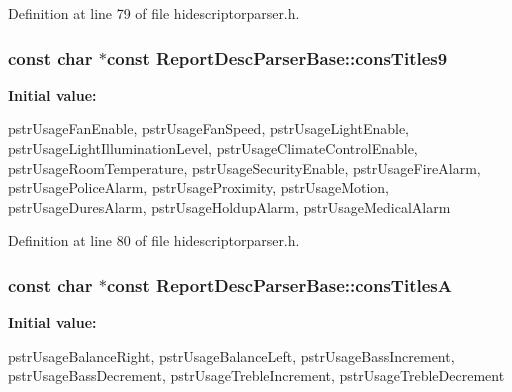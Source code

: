 \-Definition at line 79 of file hidescriptorparser.\-h.

\hypertarget{class_report_desc_parser_base_ac47d6ae6c995224d151aed3403f2e38f}{
\subsubsection[{cons\-Titles9}]{\setlength{\rightskip}{0pt plus 5cm}const char $\ast$const {\bf \-Report\-Desc\-Parser\-Base\-::cons\-Titles9}}}\label{class_report_desc_parser_base_ac47d6ae6c995224d151aed3403f2e38f}
{\bfseries \-Initial value\-:}
\begin{DoxyCode}
 {
        pstrUsageFanEnable,
        pstrUsageFanSpeed,
        pstrUsageLightEnable,
        pstrUsageLightIlluminationLevel,
        pstrUsageClimateControlEnable,
        pstrUsageRoomTemperature,
        pstrUsageSecurityEnable,
        pstrUsageFireAlarm,
        pstrUsagePoliceAlarm,
        pstrUsageProximity,
        pstrUsageMotion,
        pstrUsageDuresAlarm,
        pstrUsageHoldupAlarm,
        pstrUsageMedicalAlarm
}
\end{DoxyCode}


\-Definition at line 80 of file hidescriptorparser.\-h.

\hypertarget{class_report_desc_parser_base_a27f2a10cbf94bc44a25d221d794ce3f3}{
\subsubsection[{cons\-Titles\-A}]{\setlength{\rightskip}{0pt plus 5cm}const char $\ast$const {\bf \-Report\-Desc\-Parser\-Base\-::cons\-Titles\-A}}}\label{class_report_desc_parser_base_a27f2a10cbf94bc44a25d221d794ce3f3}
{\bfseries \-Initial value\-:}
\begin{DoxyCode}
 {
        pstrUsageBalanceRight,
        pstrUsageBalanceLeft,
        pstrUsageBassIncrement,
        pstrUsageBassDecrement,
        pstrUsageTrebleIncrement,
        pstrUsageTrebleDecrement
}
\end{DoxyCode}


